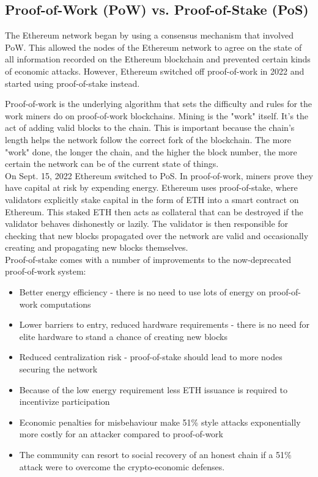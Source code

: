 \documentclass[MSE,Master,english]{twbook}%
\begin{document}
\subsection{Proof-of-Work (PoW) vs. Proof-of-Stake (PoS)}
The Ethereum network began by using a consensus mechanism that involved \ac{PoW}\cite{PoW}. This allowed the nodes of the Ethereum network to agree on the state of all information recorded on the Ethereum blockchain and prevented certain kinds of economic attacks. However, Ethereum switched off proof-of-work in 2022 and started using proof-of-stake instead.

Proof-of-work is the underlying algorithm that sets the difficulty and rules for the work miners do on proof-of-work blockchains. Mining is the "work" itself. It's the act of adding valid blocks to the chain. This is important because the chain's length helps the network follow the correct fork of the blockchain. The more "work" done, the longer the chain, and the higher the block number, the more certain the network can be of the current state of things. \\

On Sept. 15, 2022 Ethereum switched to \ac{PoS}\cite{PoS}. In proof-of-work, miners prove they have capital at risk by expending energy. Ethereum uses proof-of-stake, where validators explicitly stake capital in the form of ETH into a smart contract on Ethereum. This staked ETH then acts as collateral that can be destroyed if the validator behaves dishonestly or lazily. The validator is then responsible for checking that new blocks propagated over the network are valid and occasionally creating and propagating new blocks themselves. \\

Proof-of-stake comes with a number of improvements to the now-deprecated proof-of-work system:

\begin{itemize}
  \item Better energy efficiency - there is no need to use lots of energy on proof-of-work computations
  \item Lower barriers to entry, reduced hardware requirements - there is no need for elite hardware to stand a chance of creating new blocks
  \item Reduced centralization risk - proof-of-stake should lead to more nodes securing the network
  \item Because of the low energy requirement less ETH issuance is required to incentivize participation
  \item Economic penalties for misbehaviour make 51\% style attacks exponentially more costly for an attacker compared to proof-of-work
  \item The community can resort to social recovery of an honest chain if a 51\% attack were to overcome the crypto-economic defenses.
\end{itemize}
\end{document}
